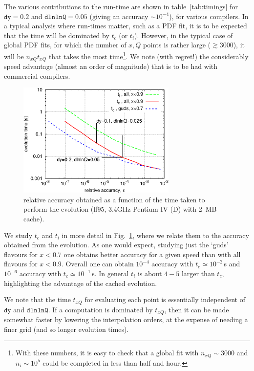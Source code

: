 \documentclass[12pt]{article}
\newcommand{\dy}{\ttt{dy}}
\newcommand{\dlnlnQ}{\ttt{dlnlnQ}}
\newcommand{\ttt}[1]{\texttt{#1}}
\begin{document}
The various contributions to the run-time are shown in
table~\ref{tab:timings} for $\dy=0.2$ and $\dlnlnQ=0.05$ (giving an
accuracy $\sim 10^{-4}$), for various compilers.  In a typical
analysis where run-times matter, such as a PDF fit, it is to be
expected that the time will be dominated by $t_c$ (or $t_i$). However,
in the typical case of global PDF fits, for which
the number of $x,Q$ points is rather large ($\gtrsim 3000$), 
 it will be $n_{xQ} t_{xQ}$ that takes the most time\footnote{
With these numbers, it is easy to check that a global fit with
$n_{xQ}\sim 3000$ and $n_i\sim 10^5$ could be completed
in less than half and hour.}. We note (with regret!) the
considerably speed advantage (almost an order
of magnitude) that is to be had with commercial
compilers.

\begin{figure}
  \centering
  \includegraphics[width=0.7\textwidth]{../benchmarking/test_acc/acc-v-time.eps}%
  \caption{relative accuracy obtained as a function of the time taken
    to perform the evolution (lf95, 3.4GHz Pentium IV (D) with 2~MB
    cache).}
  \label{fig:acc-v-time}
\end{figure}

We study $t_c$ and $t_i$ in more detail in Fig.~\ref{fig:acc-v-time},
where we relate them to the accuracy obtained from the evolution. As
one would expect, studying just the `guds' flavours for $x<0.7$ one
obtains better accuracy for a given speed than with all flavours for
$x<0.9$. Overall one can obtain $10^{-4}$ accuracy with $t_c \simeq
10^{-2}$\,s and $10^{-6}$ accuracy with $t_c \simeq 10^{-1}$\,s. In
general $t_i$ is about $4-5$ larger than $t_c$, highlighting the
advantage of the cached evolution. 

We note that the time $t_{xQ}$ for evaluating each point is
essentially independent of $\dy$ and $\dlnlnQ$. If a computation is
dominated by $t_{xQ}$, then it can be made somewhat faster by
lowering the interpolation orders, at the expense of needing a finer
grid (and so longer evolution times).
\end{document}
